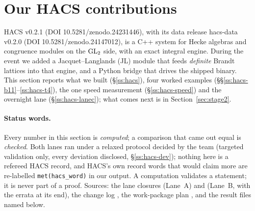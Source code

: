 \section{Our HACS contributions}\label{sec:hacs}

HACS v0.2.1 \cite{HACS021} (DOI 10.5281/zenodo.24231446), with its data release hacs-data v0.2.0 \cite{HACSdata020}
(DOI 10.5281/zenodo.24147012), is a C++ system for Hecke algebras and congruence modules on the $\mathrm{GL}_2$ side, with an
exact integral engine. During the event we added a Jacquet--Langlands (JL) module that feeds \emph{definite} Brandt
lattices into that engine, and a Python bridge that drives the shipped binary. This section reports what we built
(\S\ref{ss:hacs}), four worked examples (\S\S\ref{ss:hacs-b11}--\ref{ss:hacs-t4}), the one speed measurement
(\S\ref{ss:hacs-speed}) and the overnight lane (\S\ref{ss:hacs-lanec}); what comes next is in Section~\ref{sec:stage2}.

\paragraph{Status words.} Every number in this section is \emph{computed}; a comparison that came out equal is
\emph{checked}. Both lanes ran under a relaxed protocol decided by the team (targeted validation only, every deviation
disclosed, \S\ref{ss:hacs-dev}); nothing here is a refereed HACS record, and HACS's own record words that would claim more
are re-labelled \texttt{met(hacs\_word)} in our output. A computation validates a statement; it is never part of a proof.
Sources: the lane closures  (Lane~A) and
 (Lane~B, with the errata at its end), the change log
, the work-package plan , and the result files named below.

